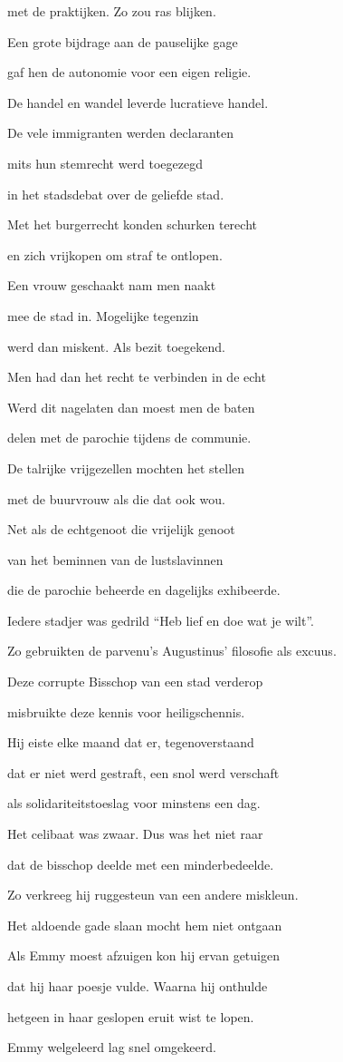 met de praktijken.
Zo zou ras blijken.

Een grote bijdrage
aan de pauselijke gage

gaf hen de autonomie
voor een eigen religie.

De handel en wandel
leverde lucratieve handel.

De vele immigranten
werden declaranten

mits hun stemrecht
werd toegezegd

in het stadsdebat
over de geliefde stad.

Met het burgerrecht
konden schurken terecht

en zich vrijkopen
om straf te ontlopen.

Een vrouw geschaakt
nam men naakt

mee de stad in.
Mogelijke tegenzin

werd dan miskent.
Als bezit toegekend.

Men had dan het recht
te verbinden in de echt

Werd dit nagelaten
dan moest men de baten

delen met de parochie
tijdens de communie.

De talrijke vrijgezellen
mochten het stellen

met de buurvrouw
als die dat ook wou.

Net als de echtgenoot
die vrijelijk genoot

van het beminnen
van de lustslavinnen

die de parochie beheerde
en dagelijks exhibeerde.

Iedere stadjer was gedrild
“Heb lief en doe wat je wilt”.

Zo gebruikten de parvenu’s
Augustinus’ filosofie als excuus.

Deze corrupte Bisschop
van een stad verderop

misbruikte deze kennis
voor heiligschennis.

Hij eiste elke maand
dat er, tegenoverstaand

dat er niet werd gestraft,
een snol werd verschaft

als solidariteitstoeslag
voor minstens een dag.

Het celibaat was zwaar.
Dus was het niet raar

dat de bisschop deelde
met een minderbedeelde.

Zo verkreeg hij ruggesteun
van een andere miskleun.

Het aldoende gade slaan
mocht hem niet ontgaan

Als Emmy moest afzuigen
kon hij ervan getuigen

dat hij haar poesje vulde.
Waarna hij onthulde

hetgeen in haar geslopen
eruit wist te lopen.

Emmy welgeleerd
lag snel omgekeerd.
